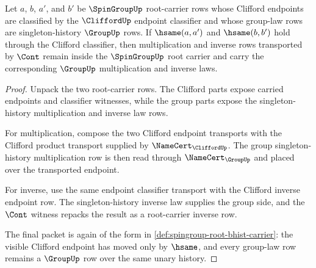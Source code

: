 \begin{theorem}
\label{thm:spingroup-root-group-law-transport}
Let $a$, $b$, $a'$, and $b'$ be $\SpinGroupUp$ root-carrier rows whose Clifford endpoints are classified by the $\CliffordUp$ endpoint classifier and whose group-law rows are singleton-history $\GroupUp$ rows. If $\hsame(a,a')$ and $\hsame(b,b')$ hold through the Clifford classifier, then multiplication and inverse rows transported by $\Cont$ remain inside the $\SpinGroupUp$ root carrier and carry the corresponding $\GroupUp$ multiplication and inverse laws.
\end{theorem}
\begin{proof}
Unpack the two root-carrier rows. The Clifford parts expose carried endpoints and classifier witnesses, while the group parts expose the singleton-history multiplication and inverse law rows.

For multiplication, compose the two Clifford endpoint transports with the Clifford product transport supplied by $\NameCert_{\CliffordUp}$. The group singleton-history multiplication row is then read through $\NameCert_{\GroupUp}$ and placed over the transported endpoint.

For inverse, use the same endpoint classifier transport with the Clifford inverse endpoint row. The singleton-history inverse law supplies the group side, and the $\Cont$ witness repacks the result as a root-carrier inverse row.

The final packet is again of the form in \autoref{def:spingroup-root-bhist-carrier}: the visible Clifford endpoint has moved only by $\hsame$, and every group-law row remains a $\GroupUp$ row over the same unary history.
\end{proof}

